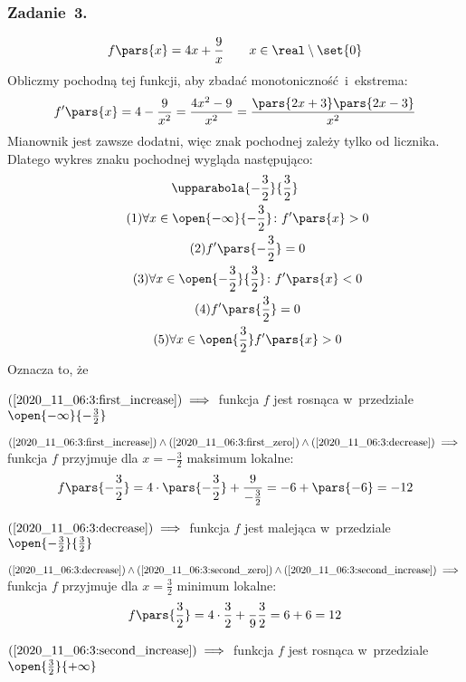 \subsubsection*{Zadanie~3.}
\begin{equation*}
    f\pars{x} = 4x + \frac{9}{x} \qquad x \in \real \setminus \set{0}
\end{equation*}
Obliczmy pochodną tej funkcji, aby zbadać monotoniczność i~ekstrema:
\begin{equation*}
    f'\pars{x}
        = 4 - \frac{9}{x^2}
        = \frac{4x^2 - 9}{x^2}
        = \frac{\pars{2x + 3}\pars{2x - 3}}{x^2}
\end{equation*}
Mianownik jest zawsze dodatni, więc znak pochodnej zależy tylko od licznika. Dlatego wykres znaku pochodnej wygląda następująco:
\begin{gather*}
    \upparabola{-\frac{3}{2}}{\frac{3}{2}}\\
    \tag{\(1\)} \forall x \in \open{-\infty}{-\frac{3}{2}}\colon f'\pars{x} > 0 \label{2020_11_06:3:first_increase}\\
    \tag{\(2\)} f'\pars{-\frac{3}{2}} = 0 \label{2020_11_06:3:first_zero}\\
    \tag{\(3\)} \forall x \in \open{-\frac{3}{2}}{\frac{3}{2}}\colon f'\pars{x} < 0 \label{2020_11_06:3:decrease}\\
    \tag{\(4\)} f'\pars{\frac{3}{2}} = 0 \label{2020_11_06:3:second_zero}\\
    \tag{\(5\)} \forall x \in \open{\frac{3}{2}} f'\pars{x} > 0 \label{2020_11_06:3:second_increase}
\end{gather*}
Oznacza to, że
\begin{description}
    \item \(\mbox{(\ref{2020_11_06:3:first_increase})} \implies\) funkcja \(f\) jest rosnąca w~przedziale \(\open{-\infty}{-\frac{3}{2}}\)
    \item \(\mbox{(\ref{2020_11_06:3:first_increase})} \land \mbox{(\ref{2020_11_06:3:first_zero})} \land \mbox{(\ref{2020_11_06:3:decrease})} \implies\) funkcja \(f\) przyjmuje dla \(x = -\frac{3}{2}\) maksimum lokalne:
        \begin{equation*}
            f\pars{-\frac{3}{2}}
                = 4 \cdot \pars{-\frac{3}{2}} + \frac{9}{-\frac{3}{2}}
                = -6 + \pars{-6}
                = -12
        \end{equation*}
    \item \(\mbox{(\ref{2020_11_06:3:decrease})} \implies\) funkcja \(f\) jest malejąca w~przedziale \(\open{-\frac{3}{2}}{\frac{3}{2}}\)
    \item \(\mbox{(\ref{2020_11_06:3:decrease})} \land \mbox{(\ref{2020_11_06:3:second_zero})} \land \mbox{(\ref{2020_11_06:3:second_increase})} \implies\) funkcja \(f\) przyjmuje dla \(x = \frac{3}{2}\) minimum lokalne:
        \begin{equation*}
            f\pars{\frac{3}{2}}
                = 4 \cdot \frac{3}{2} + \frac{}{9}{\frac{3}{2}}
                = 6 + 6
                = 12
        \end{equation*}
    \item \(\mbox{(\ref{2020_11_06:3:second_increase})} \implies\) funkcja \(f\) jest rosnąca w~przedziale \(\open{\frac{3}{2}}{+\infty}\)
\end{description}
